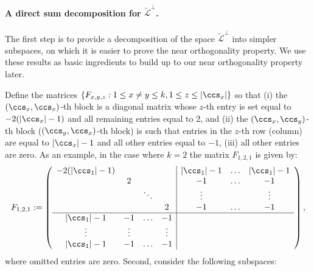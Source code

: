\paragraph{A direct sum decomposition for  $\tilde{\mathcal{L}}^\perp$.}  The first  step is to provide a decomposition of the space $\tilde{\mathcal{L}}^\perp$ into simpler subspaces, on which it is easier to prove the near orthogonality property.  We use these results as basic ingredients to build up to our near orthogonality property later.


Define the matrices $\{ F_{x,y,z} : 1 \leq x \neq y \leq k, 1\leq z \leq |\ccs_x | \}$ so that (i) the $(\ccs_x,\ccs_x)$-th block is a diagonal matrix whose $z$-th entry is set equal to $-2(|\ccs_x|-1)$ and all remaining entries equal to $2$, and (ii) the $(\ccs_x,\ccs_y)$-th block ($(\ccs_y,\ccs_x)$-th block) is such that entries in the $z$-th row (column) are equal to $|\ccs_x|-1$ and all other entries equal to $-1$, (iii) all other entries are zero. As an example, in the case where  $k=2$ the matrix  $F_{1,2,1} $ is given by:
$$F_{1,2,1} := \left( \begin{array}{cccc|ccc}
-2(|\ccs_1|-1) &&&& |\ccs_1|-1 & \ldots & |\ccs_1|-1  \\
& 2 &&& -1 & \ldots & -1  \\
&& \ddots &&\vdots &&\vdots  \\
&&&2& -1 & \ldots & -1  \\
\hline
|\ccs_1|-1 & -1 & \ldots & -1 &&& \\
\vdots & \vdots & & \vdots &&& \\
|\ccs_1|-1 & -1 & \ldots & -1 &&& \\
\end{array} \right),
$$
where omitted entries are zero. 
Second, consider the following subspaces:\medskip 


